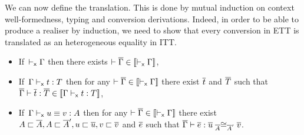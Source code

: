 We can now define the translation. This is done by mutual induction on
context well-formedness, typing and conversion derivations. Indeed,
in order to be able to produce a realiser by induction, we need to show
that every conversion in ETT is translated as an heterogeneous equality
in ITT.

\begin{theorem}[Translation]
  \label{thm:translation}
  \leavevmode
  \begin{itemize}
    \item If\,\,\,$\vdash_{\mathsf{x}} \Gamma$ then there exists
    $\vdash \overline{\Gamma} \in \llbracket \vdash_{\mathsf{x}} \Gamma \rrbracket$,

    \item If\,\,\,$\Gamma \vdash_{\mathsf{x}} t : T$ then for any
    $\vdash \overline{\Gamma} \in \llbracket \vdash_{\mathsf{x}} \Gamma \rrbracket$ there exist $\overline{t}$ and $\overline{T}$ such
    that $\overline{\Gamma} \vdash \overline{t} : \overline{T} \in \llbracket \Gamma \vdash_{\mathsf{x}} t : T \rrbracket$,

    \item If\,\,\,$\Gamma \vdash_{\mathsf{x}} u \equiv v : A$ then for any
    $\vdash \overline{\Gamma} \in \llbracket \vdash_{\mathsf{x}} \Gamma \rrbracket$ there exist
    $A \sqsubset \overline{A}, A \sqsubset \overline{A}', u \sqsubset \overline{u}, v \sqsubset \overline{v}$ and $\overline{e}$ such that
    $\overline{\Gamma} \vdash \overline{e} : \overline{u} \mathrel{{}_{\overline{A}}{\cong}_{\overline{A}'}} \overline{v}$.
  \end{itemize}
\end{theorem}

